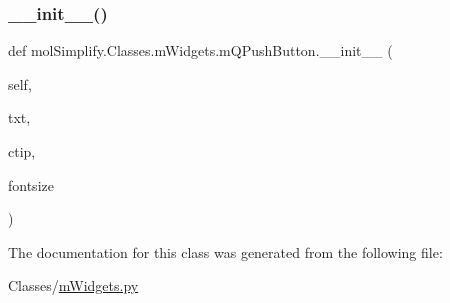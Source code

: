 \subsubsection{\texorpdfstring{\+\_\+\+\_\+init\+\_\+\+\_\+()}{\_\_init\_\_()}}
{\footnotesize\ttfamily def mol\+Simplify.\+Classes.\+m\+Widgets.\+m\+Q\+Push\+Button.\+\_\+\+\_\+init\+\_\+\+\_\+ (\begin{DoxyParamCaption}\item[{}]{self,  }\item[{}]{txt,  }\item[{}]{ctip,  }\item[{}]{fontsize }\end{DoxyParamCaption})}



The documentation for this class was generated from the following file\+:\begin{DoxyCompactItemize}
\item 
Classes/\hyperlink{mWidgets_8py}{m\+Widgets.\+py}\end{DoxyCompactItemize}
